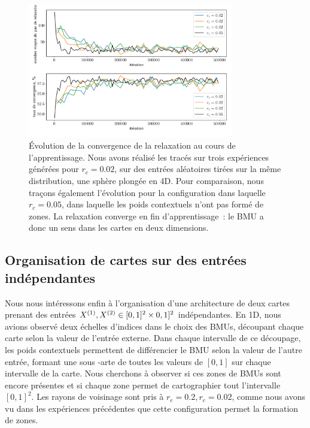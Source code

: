 \documentclass[../main]{subfiles}
\begin{document}
\begin{figure}
	\centering
	\includegraphics[width=0.8\textwidth]{conv_relax_2maps.pdf}
	\vspace{-0.5cm}
	\caption{\'Evolution de la convergence de la relaxation au cours de l'apprentissage. Nous avons réalisé les tracés sur trois expériences générées pour $r_c = 0.02$, sur des entrées aléatoires tirées sur la même distribution, une sphère plongée en 4D. Pour comparaison, nous traçons également l'évolution pour la configuration dans laquelle $r_c = 0.05$, dans laquelle les poids contextuels n'ont pas formé de zones. La relaxation converge en fin d'apprentissage~: le BMU a donc un sens dans les cartes en deux dimensions. \label{fig:relax2D}}
\end{figure}

\subsection{Organisation de cartes sur des entrées indépendantes \label{par:cub2D}}

Nous nous intéressons enfin à l'organisation d'une architecture de deux cartes prenant des entrées $X^{({1})}, X^{({2})} \in [0,1]^2 \times 0,1]^2$ indépendantes.
En 1D, nous avions observé deux échelles d'indices dans le choix des BMUs, découpant chaque carte selon la valeur de l'entrée externe. Dans chaque intervalle de ce découpage, les poids contextuels permettent de différencier le BMU selon la valeur de l'autre entrée, formant une sous -arte de toutes les valeurs de $[0,1]$ sur chaque intervalle de la carte.
Nous cherchons à observer si ces zones de BMUs sont encore présentes et si chaque zone permet de cartographier tout l'intervalle $[0,1]^2$.
Les rayons de voisinage sont pris à $r_e = 0.2, r_c = 0.02$, comme nous avons vu dans les expériences précédentes que cette configuration permet la formation de zones.
\end{document}
